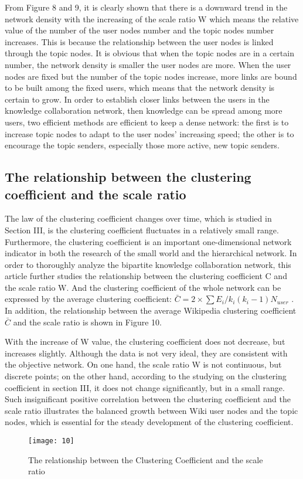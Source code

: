 \documentclass{elsarticle}
\begin{document}
From Figure 8 and 9, it is clearly shown that there is a downward trend in the network density with the increasing of the scale ratio W which means the relative value of the number of the user nodes number and the topic nodes number increases. This is because the relationship between the user nodes is linked through the topic nodes. It is obvious that when the topic nodes are in a certain number, the network density is smaller the user nodes are more. When the user nodes are fixed but the number of the topic nodes increase, more links are bound to be built among the fixed users, which means that the network density is certain to grow. In order to establish closer links between the users in the knowledge collaboration network, then knowledge can be spread among more users, two efficient methods are efficient to keep a dense network: the first is to increase topic nodes to adapt to the user nodes’ increasing speed; the other is to encourage the topic senders, especially those more active, new topic senders. 

\subsection{ The relationship between the clustering coefficient and the scale ratio}
\label{sec:relat-betw-clust}

The law of the clustering coefficient changes over time, which is
studied in Section III, is the clustering coefficient fluctuates in a
relatively small range. Furthermore, the clustering coefficient is an
important one-dimensional network indicator in both the research of
the small world and the hierarchical network. In order to thoroughly
analyze the bipartite knowledge collaboration network, this article
further studies the relationship between the clustering coefficient C
and the scale ratio W. And the clustering coefficient of the whole
network can be expressed by the average clustering coefficient:
$\bar{C}=2\times \sum E_i/k_i(k_i-1)N_{user}$ . In addition, the
relationship between the average Wikipedia clustering coefficient
$\bar{C}$ and the scale ratio is shown in Figure 10. 

With the increase of W value, the clustering coefficient does not decrease, but increases slightly. Although the data is not very ideal, they are consistent with the objective network. On one hand, the scale ratio W is not continuous, but discrete points; on the other hand, according to the studying on the clustering coefficient in section III, it does not change significantly, but in a small range. Such insignificant positive correlation between the clustering coefficient and the scale ratio illustrates the balanced growth between Wiki user nodes and the topic nodes, which is essential for the steady development of the clustering coefficient. 
\begin{figure}[htpb]
  \centering
  \texttt{[image: 10]}
  \caption{The relationship between the  Clustering Coefficient  and the scale ratio}
\end{figure}
\end{document}
